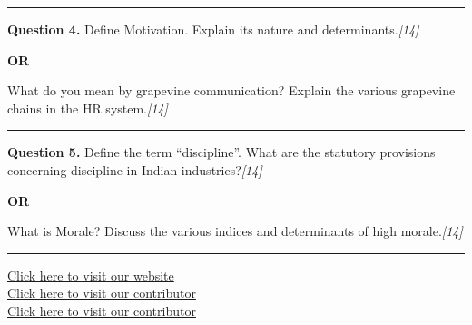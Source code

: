 \documentclass[11pt,a4paper]{article}
\newcommand{\pts}[1]{\hfill   \textit{[#1]}}
\begin{document}
\medskip\rule{\linewidth}{0.2pt}




\noindent   \textbf{Question 4.}
Define Motivation. Explain its nature and determinants.\pts{14}

\centerline{   \textbf{OR}}

What do you mean by grapevine communication? Explain the various grapevine chains in the HR system.\pts{14}

\medskip\rule{\linewidth}{0.2pt}




\noindent   \textbf{Question 5.}
Define the term ``discipline''. What are the statutory provisions concerning discipline in Indian industries?\pts{14}

\centerline{   \textbf{OR}}

What is Morale? Discuss the various indices and determinants of high morale.\pts{14}

\vfill
\rule{\linewidth}{0.4pt}

\begin{center}\small
\href{https://bhu-exam.vercel.app/}{Click here to visit our website}\\[4pt]
\href{https://me-aryan.vercel.app/}{Click here to visit our contributor}\\[4pt]
\href{https://quashan-me.vercel.app/}{Click here to visit our contributor}
\end{center}
\end{document}
